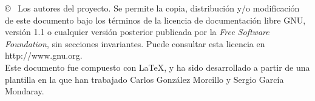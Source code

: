 \copyright~ Los autores del proyecto. Se permite la copia, distribución y/o
modificación de este documento bajo los términos de la licencia de
documentación libre GNU, versión 1.1 o cualquier versión posterior publicada
por la {\em Free Software Foundation}, sin secciones invariantes. Puede
consultar esta licencia en http://www.gnu.org. \\[0.2cm]
Este documento fue compuesto con \LaTeX{}, y ha sido desarrollado a partir de una plantilla en la que han trabajado Carlos González Morcillo y Sergio García Mondaray.
